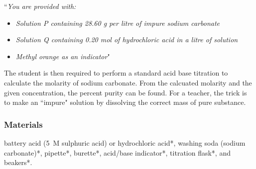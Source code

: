 ``\textit{You are provided with:}
\begin{itemize}
\item{\textit{Solution P containing 28.60 g per litre of impure sodium carbonate}}
\item{\textit{Solution Q containing 0.20 mol of hydrochloric acid in a litre of solution}}
\item{\textit{Methyl orange as an indicator}}"
\end{itemize}
\bigskip
\bigskip
The student is then required to perform a standard acid base titration to calculate the molarity of sodium carbonate. From the calcuated molarity and the given concentration, the percent purity can be found. For a teacher, the trick is to make an ``impure" solution by dissolving the correct mass of pure substance. 
\subsubsection{Materials}
battery acid (5~M sulphuric acid) or hydrochloric acid*, washing soda (sodium carbonate)*, pipette*, burette*, acid/base indicator*, titration flask*, and beakers*.
